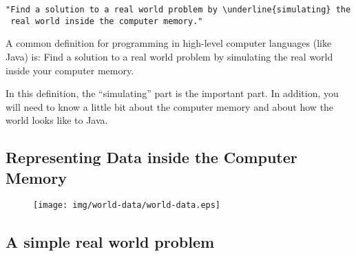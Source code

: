 \documentclass[8pt, a4paper, oneside]{extarticle}
\begin{document}
\begin{multicols}{2}
\begin{Verbatim}
"Find a solution to a real world problem by \underline{simulating} the
 real world inside the computer memory."
\end{Verbatim}
  \columnbreak

  A common definition for programming in high-level computer languages (like
  Java) is: Find a solution to a real world problem by simulating the real
  world inside your computer memory.

  In this definition, the ``simulating'' part is the important part. In
  addition, you will need to know a little bit about the computer memory
  and about how the world looks like to Java.

\end{multicols}

\subsection{Representing Data inside the Computer Memory}

\begin{figure}[!ht]
  \centering
  \texttt{[image: img/world-data/world-data.eps]}
\end{figure}

\subsection{A simple real world problem}
\end{document}
